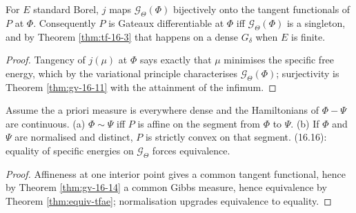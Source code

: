 \begin{theorem}[Georgii (16.14)]
    \label{thm:gv-16-14}
    \leanok

    For $E$ standard Borel, $j$ maps $\mathcal G_\Theta(\Phi)$ bijectively onto the tangent
    functionals of $P$ at $\Phi$. Consequently $P$ is Gateaux differentiable at $\Phi$ iff
    $\mathcal G_\Theta(\Phi)$ is a singleton, and by Theorem \ref{thm:tf-16-3} that happens on a
    dense $G_\delta$ when $E$ is finite.
\end{theorem}
\begin{proof}
    \leanok
    Tangency of $j(\mu)$ at $\Phi$ says exactly that $\mu$ minimises the specific free energy,
    which by the variational principle characterises $\mathcal G_\Theta(\Phi)$; surjectivity is
    Theorem \ref{thm:gv-16-11} with the attainment of the infimum.
\end{proof}

\begin{theorem}[Georgii (16.15), (16.16)]
    \label{thm:gv-16-15}
    \leanok

    Assume the a priori measure is everywhere dense and the Hamiltonians of $\Phi - \Psi$ are
    continuous. (a) $\Phi \sim \Psi$ iff $P$ is affine on the segment from $\Phi$ to $\Psi$.
    (b) If $\Phi$ and $\Psi$ are normalised and distinct, $P$ is strictly convex on that segment. (16.16): equality
    of specific energies on $\mathcal G_\Theta$ forces equivalence.
\end{theorem}
\begin{proof}
    \leanok
    Affineness at one interior point gives a common tangent functional, hence by Theorem
    \ref{thm:gv-16-14} a common Gibbs measure, hence equivalence by Theorem \ref{thm:equiv-tfae};
    normalisation upgrades equivalence to equality.
\end{proof}

